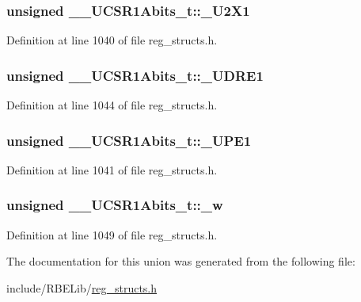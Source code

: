 \hypertarget{union_____u_c_s_r1_abits__t_ad2445ee4df3f594561e2160370aa2cf3}{
\subsubsection[{\+\_\+\+U2\+X1}]{\setlength{\rightskip}{0pt plus 5cm}unsigned \+\_\+\+\_\+\+U\+C\+S\+R1\+Abits\+\_\+t\+::\+\_\+\+U2\+X1}}\label{union_____u_c_s_r1_abits__t_ad2445ee4df3f594561e2160370aa2cf3}


Definition at line 1040 of file reg\+\_\+structs.\+h.

\hypertarget{union_____u_c_s_r1_abits__t_a33d9b71b4098a3f014aae771b120b178}{
\subsubsection[{\+\_\+\+U\+D\+R\+E1}]{\setlength{\rightskip}{0pt plus 5cm}unsigned \+\_\+\+\_\+\+U\+C\+S\+R1\+Abits\+\_\+t\+::\+\_\+\+U\+D\+R\+E1}}\label{union_____u_c_s_r1_abits__t_a33d9b71b4098a3f014aae771b120b178}


Definition at line 1044 of file reg\+\_\+structs.\+h.

\hypertarget{union_____u_c_s_r1_abits__t_af2de1f2c93bcaa75498d48a04040302c}{
\subsubsection[{\+\_\+\+U\+P\+E1}]{\setlength{\rightskip}{0pt plus 5cm}unsigned \+\_\+\+\_\+\+U\+C\+S\+R1\+Abits\+\_\+t\+::\+\_\+\+U\+P\+E1}}\label{union_____u_c_s_r1_abits__t_af2de1f2c93bcaa75498d48a04040302c}


Definition at line 1041 of file reg\+\_\+structs.\+h.

\hypertarget{union_____u_c_s_r1_abits__t_adce88bf5075c4eed792643beac7a5ca0}{
\subsubsection[{\+\_\+w}]{\setlength{\rightskip}{0pt plus 5cm}unsigned \+\_\+\+\_\+\+U\+C\+S\+R1\+Abits\+\_\+t\+::\+\_\+w}}\label{union_____u_c_s_r1_abits__t_adce88bf5075c4eed792643beac7a5ca0}


Definition at line 1049 of file reg\+\_\+structs.\+h.



The documentation for this union was generated from the following file\+:\begin{DoxyCompactItemize}
\item 
include/\+R\+B\+E\+Lib/\hyperlink{reg__structs_8h}{reg\+\_\+structs.\+h}\end{DoxyCompactItemize}
